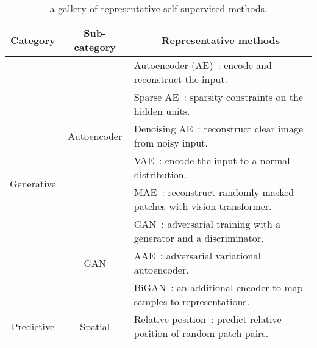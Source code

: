 \documentclass[lettersize,journal]{IEEEtran}
\begin{document}
\begin{table*}
\caption{a gallery of representative self-supervised methods.}
\centering

\begin{tabular}{|c|c|l|}
\hline
Category                                          & Sub-category                            & \multicolumn{1}{c|}{Representative methods}                                                                       \\ \hline
\multicolumn{1}{|l|}{\multirow{8}{*}{Generative}} & \multirow{5}{*}{Autoencoder}            & Autoencoder (AE)~\cite{ballard1987modular}: encode and reconstruct the input.                                     \\
\multicolumn{1}{|l|}{}                            &                                         & Sparse AE~\cite{ng2011sparse}: sparsity constraints on the hidden units.                                          \\
\multicolumn{1}{|l|}{}                            &                                         & Denoising AE~\cite{vincent2010stacked}: reconstruct clear image from noisy input.                                 \\
\multicolumn{1}{|l|}{}                            &                                         & VAE~\cite{kingma2013auto}: encode the input to a normal distribution.                                             \\
\multicolumn{1}{|l|}{}                            &                                         & MAE~\cite{he2021masked}: reconstruct randomly masked patches with vision transformer.                             \\ \cline{2-3} 
\multicolumn{1}{|l|}{}                            & \multirow{3}{*}{GAN}                    & GAN~\cite{goodfellow2014generative}: adversarial training with a generator and a discriminator.                   \\
\multicolumn{1}{|l|}{}                            &                                         & AAE~\cite{makhzani2015adversarial}: adversarial variational autoencoder.                                          \\
\multicolumn{1}{|l|}{}                            &                                         & BiGAN~\cite{donahue2016adversarial}: an additional encoder to map samples to representations.                     \\ \hline
\multirow{9}{*}{Predictive}                       & \multirow{4}{*}{Spatial}                & Relative position~\cite{doersch2015unsupervised}: predict relative position of random patch pairs.                \\

\end{tabular}
\end{table*}
\end{document}
